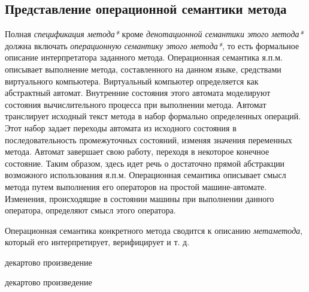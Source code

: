 \subsection{Представление операционной семантики метода}

Полная \textit{спецификация метода*} кроме \textit{денотационной семантики этого метода*} должна включать \textit{операционную семантику этого метода*}, то есть формальное описание интерпретатора заданного метода. Операционная семантика я.п.м. описывает выполнение метода, составленного на данном языке, средствами виртуального компьютера. Виртуальный компьютер определяется как абстрактный автомат. Внутренние состояния этого автомата моделируют состояния вычислительного процесса при выполнении метода. Автомат транслирует исходный текст метода в набор формально определенных операций. Этот набор задает переходы автомата из исходного состояния в последовательность промежуточных состояний, изменяя значения переменных метода. Автомат завершает свою работу, переходя в некоторое конечное состояние. Таким образом, здесь идет речь о достаточно прямой абстракции возможного использования я.п.м. Операционная семантика описывает смысл метода путем выполнения его операторов на простой машине-автомате. Изменения, происходящие в состоянии машины при выполнении данного оператора, определяют смысл этого оператора.

Операционная семантика конкретного метода сводится к описанию \textit{метаметода}, который его интерпретирует, верифицирует и т. д.

\begin{SCn}
\end{SCn}

\begin{SCn}
\begin{scnindent}
    \begin{scnreltovector}{декартово произведение}
    \end{scnreltovector}
\end{scnindent}
\begin{scnindent}
    \begin{scnreltovector}{декартово произведение}
    \end{scnreltovector}
\end{scnindent}
\end{SCn}

